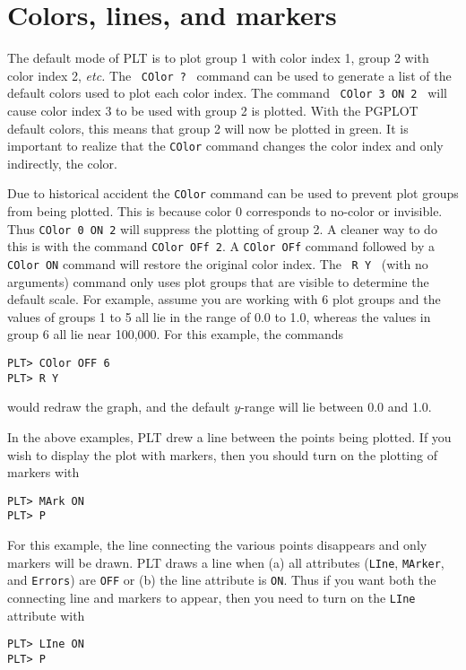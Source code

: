 \section{Colors, lines, and markers}
The default mode of PLT is to plot group 1 with color index 1,
group 2 with color index 2, {\it etc.}
The \, {\tt COlor~?} \,  command can be used to generate
a list of the default colors used to plot each color index.
The command \, {\tt COlor~3~ON~2} \, will cause color index 3
to be used with group 2 is plotted.
With the PGPLOT default colors,
this means that group 2 will now be plotted in green.
It is important to realize that the {\tt COlor} command
changes the color index and only indirectly, the color.

Due to historical accident the {\tt COlor} command can be used to
prevent plot groups from being plotted.
This is because color 0 corresponds to no-color or invisible.
Thus {\tt COlor~0~ON~2} will suppress the plotting of group 2.
A cleaner way to do this is with the command {\tt COlor~OFf~2}.
A {\tt COlor~OFf} command followed by a {\tt COlor ON} command will
restore the original color index.
The \, {\tt R~Y} \, (with no arguments) command only uses plot groups
that are visible to determine the default scale.
For example, assume you are working with 6 plot groups
and the values of groups 1 to 5 all lie in the range of 0.0 to 1.0,
whereas the values in group 6 all lie near 100,000.
For this example, the commands

\begin{verbatim}
PLT> COlor OFF 6
PLT> R Y
\end{verbatim}
would redraw the graph,
and the default $y$-range will lie between 0.0 and 1.0.

In the above examples, PLT drew a line between the points being plotted.
If you wish to display the plot with markers, then you should turn
on the plotting of markers with
\begin{verbatim}
PLT> MArk ON
PLT> P
\end{verbatim}
For this example, the line connecting the various points disappears
and only markers will be drawn.
PLT draws a line when (a) all attributes
({\tt LIne}, {\tt MArker}, and {\tt Errors}) are {\tt OFF}
or (b) the line attribute is {\tt ON}.
Thus if you want both the connecting line and markers to appear,
then you need to turn on the {\tt LIne} attribute with
\begin{verbatim}
PLT> LIne ON
PLT> P
\end{verbatim}

